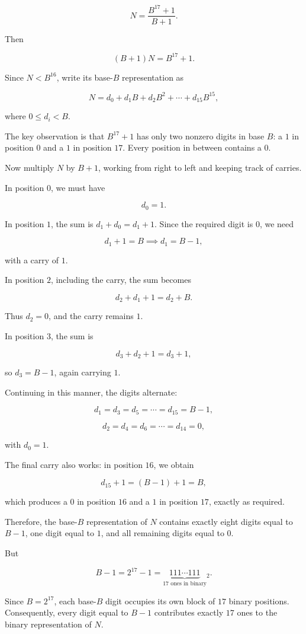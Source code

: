 \begin{enumerate}
 
 \[N=\frac{B^{17}+1}{B+1}.\]

 Then

 
 \[(B+1)N=B^{17}+1.\]

 Since $N<B^{16}$, write its base-$B$ representation as

 
 \[N=d_0+d_1B+d_2B^2+\cdots+d_{15}B^{15},\]

 where $0\le d_i<B$.

 The key observation is that $B^{17}+1$ has only two nonzero digits in base $B$: a $1$ in position $0$ and a $1$ in position $17$. Every position in between contains a $0$.

 Now multiply $N$ by $B+1$, working from right to left and keeping track of carries.

 In position $0$, we must have

 
 \[d_0=1.\]

 In position $1$, the sum is $d_1+d_0=d_1+1$. Since the required digit is $0$, we need

 
 \[d_1+1=B\implies d_1=B-1,\]

 with a carry of $1$.

 In position $2$, including the carry, the sum becomes

 
 \[d_2+d_1+1=d_2+B.\]

 Thus $d_2=0$, and the carry remains $1$.

 In position $3$, the sum is

 
 \[d_3+d_2+1=d_3+1,\]

 so $d_3=B-1$, again carrying $1$.

 Continuing in this manner, the digits alternate:

 
 \[d_1=d_3=d_5=\cdots=d_{15}=B-1,\]

 \[d_2=d_4=d_6=\cdots=d_{14}=0,\]

 with $d_0=1$.

 The final carry also works: in position $16$, we obtain

 
 \[d_{15}+1=(B-1)+1=B,\]

 which produces a $0$ in position $16$ and a $1$ in position $17$, exactly as required.

 Therefore, the base-$B$ representation of $N$ contains exactly eight digits equal to $B-1$, one digit equal to $1$, and all remaining digits equal to $0$.

 But

 
 \[B-1=2^{17}-1=\underbrace{111\cdots111}_{17\text{ ones in binary}}{}_2.\]

 Since $B=2^{17}$, each base-$B$ digit occupies its own block of $17$ binary positions. Consequently, every digit equal to $B-1$ contributes exactly $17$ ones to the binary representation of $N$.


\end{enumerate}
